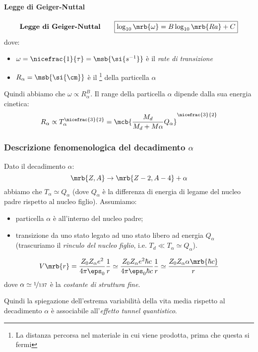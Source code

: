 \paragraph{Legge di Geiger-Nuttal}
\[
  \textbf{Legge di Geiger-Nuttal}\qquad
  \boxed{
    \log_{10} \mrb{\omega} = B \log _{10} \mrb{Ra} + C
  }
\]
dove:
\begin{itemize}
  \item $\omega = \nicefrac{1}{\tau} = \msb{\si{s^{-1}}}$ è il \textit{rate di
    transizione}
  \item $R _{\alpha} = \msb{\si{\cm}}$ è il \textit{}\footnote{
      La distanza percorsa nel materiale in cui viene prodotta, prima che
      questa si fermi
    } della particella $\alpha$
\end{itemize}
Quindi abbiamo che $\omega \propto R _{\alpha}^{B}$. %
Il range della particella $\alpha$ dipende dalla sua energia cinetica:
\[
  R _{\alpha} \propto T _{\alpha}^{\nicefrac{3}{2}} = \mcb{\frac{M _{d}}{M _{d}
  + M \alpha} Q _{\alpha}}^{\nicefrac{3}{2}}
\]

\subsubsection{Descrizione fenomenologica del decadimento $\alpha$}
Dato il decadimento $\alpha$:
\[
  \mrb{Z, A} \rightarrow \mrb{Z - 2, A - 4} + \alpha
\]
abbiamo che $T _{\alpha} \simeq Q _{\alpha}$ (dove $Q _{\alpha}$ è la
differenza di energia di legame del nucleo padre rispetto al nucleo figlio).
Assumiamo:
\begin{itemize}
  \item particella $\alpha$ è \textit{} all'interno del
    nucleo padre;
  \item transizione da uno stato legato ad uno stato libero ad energia $Q
    _{\alpha}$ (trascuriamo il \textit{rinculo del nucleo figlio}, i.e. $T _{d}
    \ll T _{\alpha} \simeq Q _{\alpha}$).
\end{itemize}


\[
  V \mrb{r} = \frac{Z_0 Z _{\alpha} e^2}{4 \pi \eps_0} \frac{1}{r} \simeq
  \frac{Z_0 Z _{\alpha} e^2 \hbar c}{4 \pi \eps_0 \hbar c} \frac{1}{r} \simeq
  \frac{Z_0 Z _{\alpha} \alpha \mrb{\hbar c}}{r}
\]
dove $\alpha \simeq \nicefrac{1}{137}$ è la \textit{costante di struttura
fine}.

Quindi la spiegazione dell'estrema variabilità della vita media rispetto al
decadimento $\alpha$ è associabile all'\textit{effetto tunnel quantistico}.

